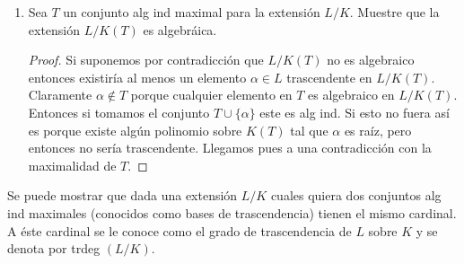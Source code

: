 \documentclass[letter,twoside,12pt]{article}
\begin{document}
\begin{enumerate}
\begin{enumerate}
\begin{proof}
Vamos a utilizar el Lema de Zorn sobre la colección de subconjuntos alg ind de $ L $. Esta colección es no vacía si tomamos en cuenta el vacío, que por vacuidad cumple todas las condiciones de subconjuntos alg ind. Ahora sea $ C $ una cadena de colecciones alg ind. Vamos a demostrar que $ B = \bigcup_{A \in C} A $ es una cota para la cadena $ C $. Claramente $ A \subseteq B $ para cualquier $ A \in C $. Entonces solo resta demostrar que $ B $ es un conjunto alg ind. Entonces tome cualesquiera $ t_1,\cdots, t_n \in T $. Por cada $ t_i $ existe un $ A_i $ en la cadena y como son finitos yo puedo tomar algun $ A_n $ tal que los contenga a todos. Luego como $ A_n $ es un conjunto alg ind concluimos que no hay ningun polinomio distinto de 0 que al evaluarlo con estos parametros de 0. Por lo tanto, concluimos que $ B $ es una cota y luego podemos utilizar el Lema de Zorn para concluir que debe existir algún subconjunto alg ind máximal.
\end{proof}

\item  Sea $ T $ un conjunto alg ind maximal para la extensión $ L/K $. Muestre que la extensión $ L/K(T) $ es
algebráica.

\begin{proof}
Si suponemos por contradicción que $ L/K(T) $ no es algebraico entonces existiría al menos un elemento $ \alpha \in L $ trascendente en $ L/K(T) $. Claramente $ \alpha \not \in T $ porque cualquier elemento en $ T $ es algebraico en $ L/K(T) $. Entonces si tomamos el conjunto $ T \cup \{\alpha\} $ este es alg ind. Si esto no fuera así es porque existe algún polinomio sobre $ K(T) $ tal que $ \alpha $ es raíz, pero entonces no sería trascendente. Llegamos pues a una contradicción con la maximalidad de $ T $.    
\end{proof}

\end{enumerate}
Se puede mostrar que dada una extensión $ L/K $ cuales quiera dos conjuntos alg ind maximales (conocidos
como bases de trascendencia) tienen el mismo cardinal. A éste cardinal se le conoce como el grado de
trascendencia de $ L $ sobre $ K $ y se denota por trdeg $ (L/K) $.

\end{enumerate}
\end{document}

